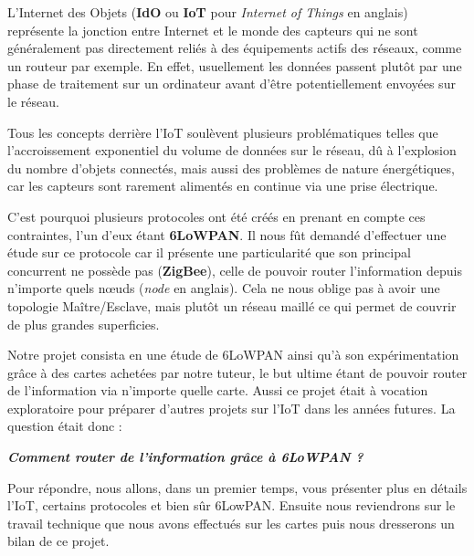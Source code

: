 
L'Internet des Objets (\textbf{IdO} ou \textbf{IoT} pour \textit{Internet of Things} en anglais) représente la jonction entre Internet et le monde des capteurs qui ne sont généralement pas directement reliés à des équipements actifs des réseaux, comme un routeur par exemple. En effet, usuellement les données passent plutôt par une phase de traitement sur un ordinateur avant d'être potentiellement envoyées sur le réseau.

Tous les concepts derrière l'IoT soulèvent plusieurs problématiques telles que l'accroissement exponentiel du volume de données sur le réseau, dû à l'explosion du nombre d'objets connectés, mais aussi des problèmes de nature énergétiques, car les capteurs sont rarement alimentés en continue via une prise électrique.

C'est pourquoi plusieurs protocoles ont été créés en prenant en compte ces contraintes, l'un d'eux étant \textbf{6LoWPAN}. Il nous fût demandé d'effectuer une étude sur ce protocole car il présente une particularité que son principal concurrent ne possède pas (\textbf{ZigBee}), celle de pouvoir router l'information depuis n'importe quels nœuds (\textit{node} en anglais). Cela ne nous oblige pas à avoir une topologie Maître/Esclave, mais plutôt un réseau maillé ce qui permet de couvrir de plus grandes superficies.

Notre projet consista en une étude de 6LoWPAN ainsi qu'à son expérimentation grâce à des cartes achetées par notre tuteur, le but ultime étant de pouvoir router de l'information via n'importe quelle carte. Aussi ce projet était à vocation exploratoire pour préparer d'autres projets sur l'IoT dans les années futures. La question était donc :

\begin{center}
\textbf{\textit{Comment router de l'information grâce à 6LoWPAN ?}}
\end{center}

Pour répondre, nous allons, dans un premier temps, vous présenter plus en détails l'IoT, certains protocoles et bien sûr 6LowPAN. Ensuite nous reviendrons sur le travail technique que nous avons effectués sur les cartes puis nous dresserons un bilan de ce projet.
